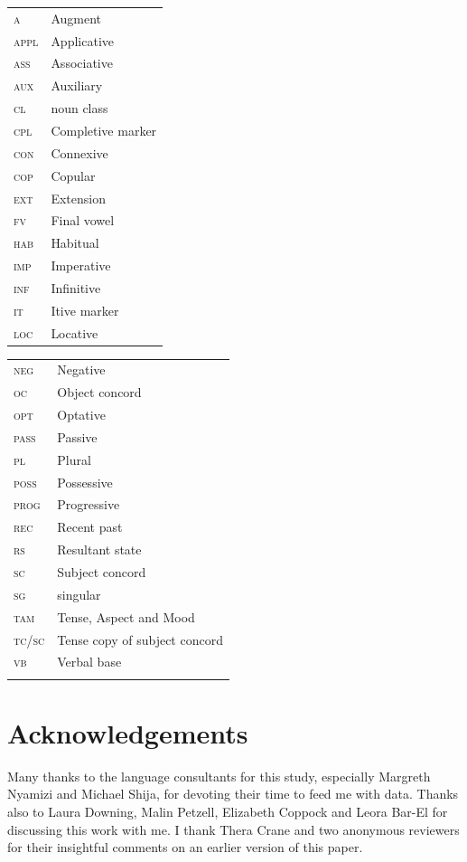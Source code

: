 \documentclass[output=paper,newtxmath,modfonts,nonflat,draftmode]{langsci/langscibook}
\begin{document}
\begin{tabularx}{.45\textwidth}{>{\scshape}lQ}
a & Augment\\
appl & Applicative\\
ass & Associative\\
aux & Auxiliary\\
cl & noun class\\
cpl & Completive marker\\
con & Connexive\\
cop & Copular\\
ext & Extension\\
fv & Final vowel\\
hab & Habitual\\
imp & Imperative\\
inf & Infinitive\\
it & Itive marker\\
loc & Locative\\
\end{tabularx}
\begin{tabularx}{.45\textwidth}{>{\scshape}ll}
neg & Negative\\
oc & Object concord\\
opt & Optative\\
pass & Passive\\
pl & Plural\\
poss & Possessive\\
prog & Progressive\\
rec & Recent past\\
rs & Resultant state\\
sc & Subject concord\\
sg & singular\\
tam & Tense, Aspect and Mood\\
tc/sc & Tense copy of subject concord\\
vb & Verbal base\\
\\
\end{tabularx}

\section*{Acknowledgements}
Many thanks to the language consultants for this study, especially Margreth Nyamizi and Michael Shija, for devoting their time to feed me with data. Thanks also to Laura Downing, Malin Petzell, Elizabeth Coppock and Leora Bar-El for discussing this work with me. I thank Thera Crane and two anonymous reviewers for their insightful comments on an earlier version of this paper.  

{\sloppy
\printbibliography[heading=subbibliography,notkeyword=this] 
}
\end{document}

